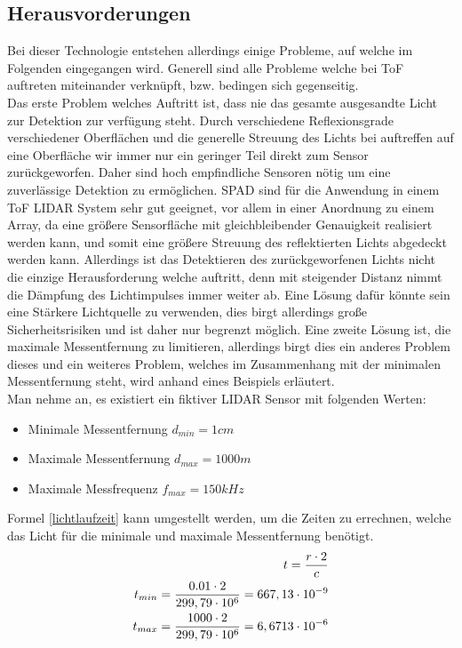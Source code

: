 \subsection{Herausvorderungen}
Bei dieser Technologie entstehen allerdings einige Probleme, auf welche im Folgenden eingegangen wird. Generell sind alle Probleme welche bei \ac{ToF} auftreten miteinander verknüpft, bzw. bedingen sich gegenseitig. \\
Das erste Problem welches Auftritt ist, dass nie das gesamte ausgesandte Licht zur Detektion zur verfügung steht. Durch verschiedene Reflexionsgrade verschiedener Oberflächen und die generelle Streuung des Lichts bei auftreffen auf eine Oberfläche wir immer nur ein geringer Teil direkt zum Sensor zurückgeworfen. Daher sind hoch empfindliche Sensoren nötig um eine zuverlässige Detektion zu ermöglichen.
\ac{SPAD} sind für die Anwendung in einem \ac{ToF} \ac{LIDAR} System sehr gut geeignet, vor allem in einer Anordnung zu einem Array, da eine größere Sensorfläche mit gleichbleibender Genauigkeit realisiert werden kann, und somit eine größere Streuung des reflektierten Lichts abgedeckt werden kann. Allerdings ist das Detektieren des zurückgeworfenen Lichts nicht die einzige Herausforderung welche auftritt, denn mit steigender Distanz nimmt die Dämpfung des Lichtimpulses immer weiter ab. Eine Lösung dafür könnte sein eine Stärkere Lichtquelle zu verwenden, dies birgt allerdings große Sicherheitsrisiken und ist daher nur begrenzt möglich. Eine zweite Lösung ist, die maximale Messentfernung zu limitieren, allerdings birgt dies ein anderes Problem dieses und ein weiteres Problem, welches im Zusammenhang mit der minimalen Messentfernung steht, wird anhand eines Beispiels erläutert.\\
Man nehme an, es existiert ein fiktiver \ac{LIDAR} Sensor mit folgenden Werten:
\begin{itemize}
	\item Minimale Messentfernung $d_{min}=1cm$
	\item Maximale Messentfernung $d_{max}=1000m$
	\item Maximale Messfrequenz $f_{max}=150kHz$ 
\end{itemize}
Formel \ref{lichtlaufzeit} kann umgestellt werden, um die Zeiten zu errechnen, welche das Licht für die minimale und maximale Messentfernung benötigt. 
\begin{equation}\formelentry{Berechnung der minimalen und maximalen Zeit}
	\begin{split}
		t = \frac{r \cdot 2}{c}\\
		t_{min} = \frac{0.01 \cdot 2}{299,79 \cdot 10^6} = 667,13 \cdot 10^{-9}\\
		t_{max} = \frac{1000 \cdot 2}{299,79 \cdot 10^6} = 6,6713 \cdot 10^{-6}\\
	\end{split}
\end{equation} 
